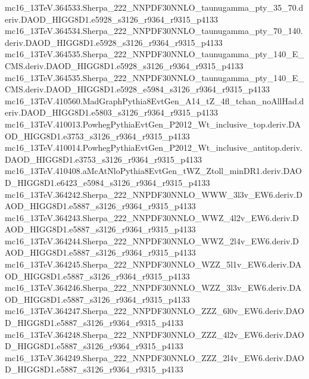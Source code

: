 \begin{scriptsize}
mc16\_13TeV.364533.Sherpa\_222\_NNPDF30NNLO\_taunugamma\_pty\_35\_70.deriv.DAOD\_HIGG8D1.e5928\_s3126\_r9364\_r9315\_p4133 \\
mc16\_13TeV.364534.Sherpa\_222\_NNPDF30NNLO\_taunugamma\_pty\_70\_140.deriv.DAOD\_HIGG8D1.e5928\_s3126\_r9364\_r9315\_p4133 \\
mc16\_13TeV.364535.Sherpa\_222\_NNPDF30NNLO\_taunugamma\_pty\_140\_E\_CMS.deriv.DAOD\_HIGG8D1.e5928\_s3126\_r9364\_r9315\_p4133 \\
mc16\_13TeV.364535.Sherpa\_222\_NNPDF30NNLO\_taunugamma\_pty\_140\_E\_CMS.deriv.DAOD\_HIGG8D1.e5928\_e5984\_s3126\_r9364\_r9315\_p4133 \\
mc16\_13TeV.410560.MadGraphPythia8EvtGen\_A14\_tZ\_4fl\_tchan\_noAllHad.deriv.DAOD\_HIGG8D1.e5803\_s3126\_r9364\_r9315\_p4133 \\
mc16\_13TeV.410013.PowhegPythiaEvtGen\_P2012\_Wt\_inclusive\_top.deriv.DAOD\_HIGG8D1.e3753\_s3126\_r9364\_r9315\_p4133 \\
mc16\_13TeV.410014.PowhegPythiaEvtGen\_P2012\_Wt\_inclusive\_antitop.deriv.DAOD\_HIGG8D1.e3753\_s3126\_r9364\_r9315\_p4133 \\
mc16\_13TeV.410408.aMcAtNloPythia8EvtGen\_tWZ\_Ztoll\_minDR1.deriv.DAOD\_HIGG8D1.e6423\_e5984\_s3126\_r9364\_r9315\_p4133 \\
mc16\_13TeV.364242.Sherpa\_222\_NNPDF30NNLO\_WWW\_3l3v\_EW6.deriv.DAOD\_HIGG8D1.e5887\_s3126\_r9364\_r9315\_p4133 \\
mc16\_13TeV.364243.Sherpa\_222\_NNPDF30NNLO\_WWZ\_4l2v\_EW6.deriv.DAOD\_HIGG8D1.e5887\_s3126\_r9364\_r9315\_p4133 \\
mc16\_13TeV.364244.Sherpa\_222\_NNPDF30NNLO\_WWZ\_2l4v\_EW6.deriv.DAOD\_HIGG8D1.e5887\_s3126\_r9364\_r9315\_p4133 \\
mc16\_13TeV.364245.Sherpa\_222\_NNPDF30NNLO\_WZZ\_5l1v\_EW6.deriv.DAOD\_HIGG8D1.e5887\_s3126\_r9364\_r9315\_p4133 \\
mc16\_13TeV.364246.Sherpa\_222\_NNPDF30NNLO\_WZZ\_3l3v\_EW6.deriv.DAOD\_HIGG8D1.e5887\_s3126\_r9364\_r9315\_p4133 \\
mc16\_13TeV.364247.Sherpa\_222\_NNPDF30NNLO\_ZZZ\_6l0v\_EW6.deriv.DAOD\_HIGG8D1.e5887\_s3126\_r9364\_r9315\_p4133 \\
mc16\_13TeV.364248.Sherpa\_222\_NNPDF30NNLO\_ZZZ\_4l2v\_EW6.deriv.DAOD\_HIGG8D1.e5887\_s3126\_r9364\_r9315\_p4133 \\
mc16\_13TeV.364249.Sherpa\_222\_NNPDF30NNLO\_ZZZ\_2l4v\_EW6.deriv.DAOD\_HIGG8D1.e5887\_s3126\_r9364\_r9315\_p4133 \\

\end{scriptsize}
